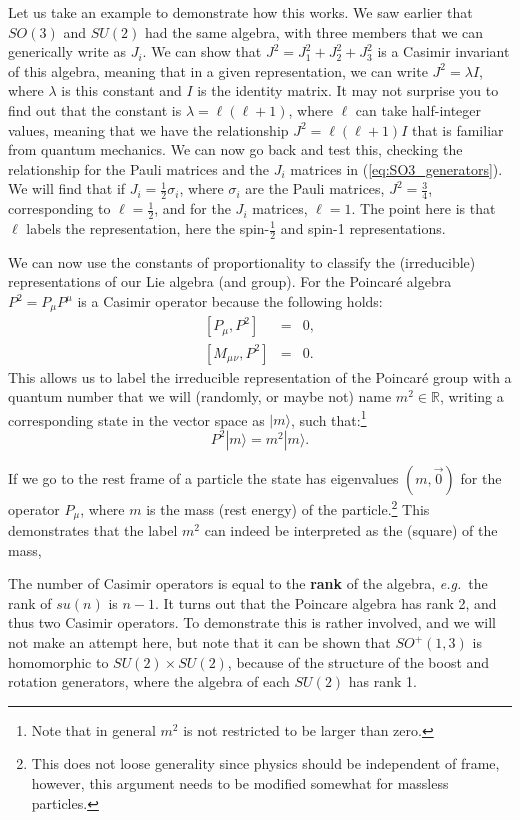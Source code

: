 \documentclass[notes.tex]{subfiles}
\begin{document}
Let us take an example to demonstrate how this works. We saw earlier that $SO(3)$ and $SU(2)$ had the same algebra, with three members that we can generically write as $J_i$. We can show that $J^2=J_1^2+J_2^2+J_3^2$ is a Casimir invariant of this algebra, meaning that in a given representation, we can write $J^2=\lambda I$, where $\lambda$ is this constant and $I$ is the identity matrix. It may not surprise you to find out that the constant is $\lambda=\ell(\ell+1)$, where $\ell$ can take half-integer values, meaning that we have the relationship $J^2=\ell(\ell+1) I$ that is familiar from quantum mechanics. We can now go back and test this, checking the relationship for the Pauli matrices and the $J_i$ matrices in (\ref{eq:SO3_generators}). We will find that if $J_i=\frac{1}{2}\sigma_i$, where $\sigma_i$ are the Pauli matrices, $J^2=\frac{3}{4}$, corresponding to $\ell=\frac{1}{2}$, and for the $J_i$ matrices, $\ell=1$. The point here is that $\ell$ labels the representation, here the spin-$\frac{1}{2}$ and spin-1 representations.

We can now use the constants of proportionality  to classify the (irreducible) representations of our Lie algebra (and group). For the Poincaré algebra $P^2 = P_\mu P^\mu$ is a Casimir operator because the following holds:
\begin{eqnarray}
\left[P_\mu, P^2\right] &=& 0,\\
\left[M_\mu{}_{\nu}, P^2\right]& =& 0.
\end{eqnarray}
This allows us to label the irreducible representation of the Poincar\'{e} group with a quantum number that we will (randomly, or maybe not) name $m^2\in\mathbb R$, writing a corresponding state in the vector space as $|m\rangle$, such that:\footnote{Note that in general $m^2$ is not restricted to be larger than zero.}
\[P^2|m\rangle = m^2 |m\rangle.\]

If we go to the rest frame of a particle the state has eigenvalues $(m, \vec{0})$ for the operator $P_\mu$, where $m$ is the mass (rest energy) of the particle.\footnote{This does not loose generality since physics should be independent of frame, however, this argument needs to be modified somewhat for massless particles.} This demonstrates that the label $m^2$ can indeed be interpreted as the (square) of the mass,

The number of Casimir operators is equal to the {\bf rank} of the algebra, {\it e.g.}\ the rank of $su(n)$ is $n-1$. It turns out that the Poincare algebra has rank 2, and thus two Casimir operators. To demonstrate this is rather involved, and we will not make an attempt here, but note that it can be shown that $SO^+(1,3)$ is homomorphic  to $SU(2)\times SU(2)$, because of the structure of the boost and rotation generators, where the algebra of each $SU(2)$ has rank 1.
\end{document}
